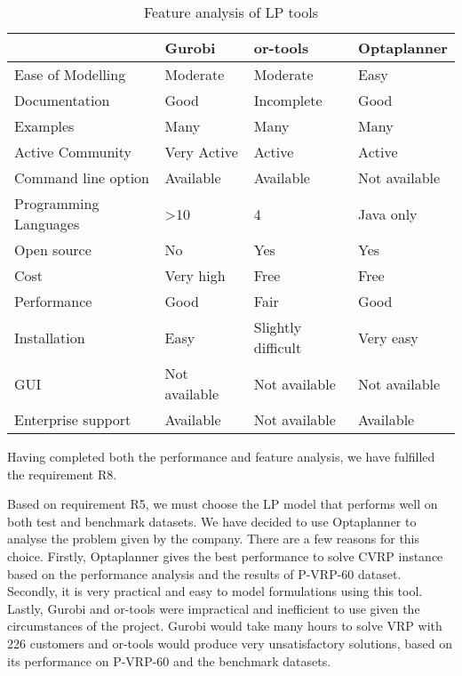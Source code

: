 \begin{table}[!ht]
\centering
\begin{tabular}{|l|l|l|l|}
\hline
                      & Gurobi        & or-tools & Optaplanner \\ \hline
Ease of Modelling     & Moderate      &   Moderate      &    Easy    \\ \hline
Documentation         & Good         &  Incomplete   &   Good       \\ \hline
Examples              & Many        &  Many        &     Many        \\ \hline
Active Community      & Very Active  &  Active     &  Active        \\ \hline
Command line option   & Available            &  Available         &  Not available          \\ \hline
Programming Languages & >10               &    4      &    Java only         \\ \hline
Open source           &   No            &    Yes      &     Yes        \\ \hline
Cost                  &  Very high     &     Free     &       Free      \\ \hline
Performance           &  Good             &   Fair        &    Good         \\ \hline
Installation          &  Easy            &   Slightly difficult      &     Very easy        \\ \hline
GUI                   &  Not available             &   Not available        &  Not available            \\ \hline
Enterprise support     &  Available             &   Not available        &     Available        \\ \hline
\end{tabular}
\caption{Feature analysis of LP tools}
\label{feature-analysis}
\end{table}

Having completed both the performance and feature analysis, we have fulfilled the requirement R8.

Based on requirement R5, we must choose the LP model that performs well on both test and benchmark datasets. We have decided to use Optaplanner to analyse the problem given by the company. There are a few reasons
for this choice. Firstly, Optaplanner gives the best performance to solve CVRP instance based on the performance analysis
and the results of P-VRP-60 dataset.  Secondly, it is very practical and easy to model formulations using
this tool. Lastly, Gurobi and or-tools were impractical and inefficient to use given the circumstances of the project. Gurobi would take many hours
 to solve VRP with 226 customers and or-tools would produce very unsatisfactory solutions, based on its performance on P-VRP-60 and the benchmark datasets.

